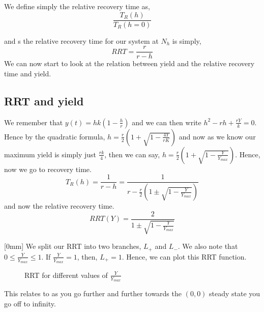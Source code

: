\noindent
\begin{ndefi}
  We define simply the relative recovery time as,
  $$ \frac{T_R (h)}{T_R(h = 0)} $$
\end{ndefi}
and s the relative recovery time for our system at $N_h$ is simply,
$$ RRT = \frac{r}{r - h} $$
We can now start to look at the relation between yield and the relative recovery time and yield.

\subsection{RRT and yield}
We remember that $y(t) = hk\left( 1 - \frac{h }{r}\right)$ and we can then write $h^2 - rh + \frac{rY}{k} = 0$. Hence by the quadratic formula, $h = \frac{r }{2} \left( 1 + \sqrt{1 - \frac{4Y}{rK}}\right)$ and now as we know our maximum yield is simply just $\frac{rk }{4}$, then we can say, $h = \frac{r }{2} \left( 1 + \sqrt{1 - \frac{Y}{Y_{max}}}\right)$.
Hence, now we go to recovery time.
$$ T_R(h) = \frac{1}{r - h} = \frac{1}{r - \frac{r }{2} \left( 1 \pm \sqrt{1 - \frac{Y}{Y_{max}}}\right)} $$
and now the relative recovery time.
$$ RRT(Y) = \frac{2}{1 \pm \sqrt{ 1 - \frac{Y}{Y_{max}}}} $$

[0mm]
We split our RRT into two branches, $L_+$ and $L_-$. We also note that $0 \le \frac{Y}{Y_{max}} \le 1$. If $\frac{Y }{Y_{max}} = 1$, then, $L_+ = 1$. Hence, we can plot this RRT function.

\begin{figure}[!ht]
\centering
{}
\caption{RRT for different values of $\frac{Y}{Y_{max}}$}
\end{figure}
This relates to as you go further and further towards the $(0, 0)$ steady state you go off to infinity.

\newpage
